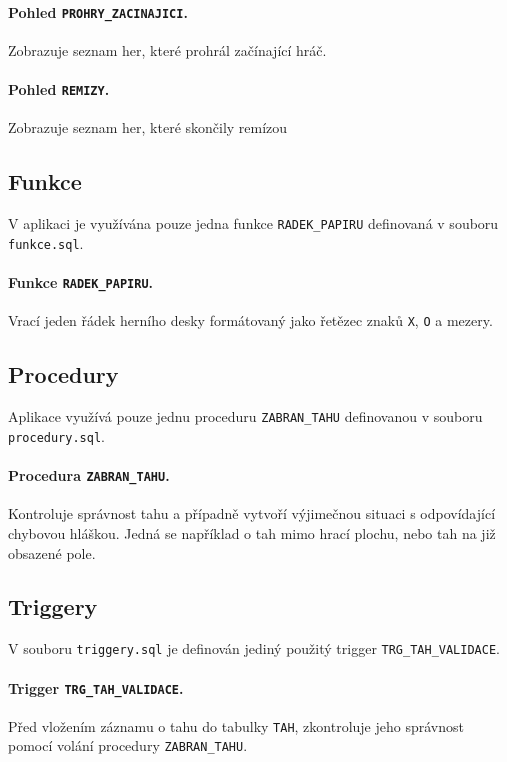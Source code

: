 \documentclass[11pt,a4paper,parskip=half-]{scrartcl}
\newcommand{\code}[1]{\texttt{#1}}
\begin{document}
\paragraph{Pohled \code{PROHRY\_ZACINAJICI}.} Zobrazuje seznam her, které
prohrál začínající hráč.

\paragraph{Pohled \code{REMIZY}.} Zobrazuje seznam her, které skončily remízou

\subsection{Funkce}

V aplikaci je využívána pouze jedna funkce \code{RADEK\_PAPIRU} definovaná v
souboru \code{funkce.sql}.

\paragraph{Funkce \code{RADEK\_PAPIRU}.} Vrací jeden řádek herního desky
formátovaný jako řetězec znaků \code{X}, \code{O} a mezery.

\subsection{Procedury}

Aplikace využívá pouze jednu proceduru \code{ZABRAN\_TAHU} definovanou v souboru
\code{procedury.sql}.

\paragraph{Procedura \code{ZABRAN\_TAHU}.} Kontroluje správnost tahu a případně
vytvoří výjimečnou situaci s odpovídající chybovou hláškou. Jedná se například o
tah mimo hrací plochu, nebo tah na již obsazené pole.

\subsection{Triggery}

V souboru \code{triggery.sql} je definován jediný použitý trigger
\code{TRG\_TAH\_VALIDACE}.

\paragraph{Trigger \code{TRG\_TAH\_VALIDACE}.} Před vložením záznamu o tahu do
tabulky \code{TAH}, zkontroluje jeho správnost pomocí volání procedury
\code{ZABRAN\_TAHU}.
\end{document}
